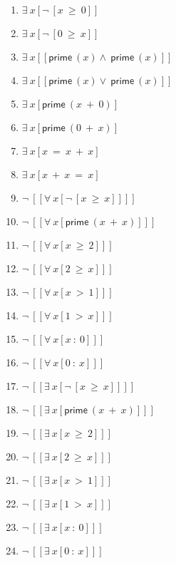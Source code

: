 \documentclass{article}
\begin{document}
\begin{enumerate}
\item $\exists \ x[\neg \ [x \ \ge \ 0]]$

\item $\exists \ x[\neg \ [0 \ \ge \ x]]$

\item $\exists \ x[[\mathsf{prime} \ (x)\wedge \ \mathsf{prime} \ (x)]]$

\item $\exists \ x[[\mathsf{prime} \ (x)\lor \ \mathsf{prime} \ (x)]]$

\item $\exists \ x[\mathsf{prime} \ (x \ + \ 0)]$

\item $\exists \ x[\mathsf{prime} \ (0 \ + \ x)]$

\item $\exists \ x[x \ = \ x \ + \ x]$

\item $\exists \ x[x \ + \ x \ = \ x]$

\item $\neg \ [[\forall \ x[\neg \ [x \ \ge \ x]]]]$

\item $\neg \ [[\forall \ x[\mathsf{prime} \ (x \ + \ x)]]]$

\item $\neg \ [[\forall \ x[x \ \ge \ 2]]]$

\item $\neg \ [[\forall \ x[2 \ \ge \ x]]]$

\item $\neg \ [[\forall \ x[x \ > \ 1]]]$

\item $\neg \ [[\forall \ x[1 \ > \ x]]]$

\item $\neg \ [[\forall \ x[x \ : \ 0]]]$

\item $\neg \ [[\forall \ x[0 \ : \ x]]]$

\item $\neg \ [[\exists \ x[\neg \ [x \ \ge \ x]]]]$

\item $\neg \ [[\exists \ x[\mathsf{prime} \ (x \ + \ x)]]]$

\item $\neg \ [[\exists \ x[x \ \ge \ 2]]]$

\item $\neg \ [[\exists \ x[2 \ \ge \ x]]]$

\item $\neg \ [[\exists \ x[x \ > \ 1]]]$

\item $\neg \ [[\exists \ x[1 \ > \ x]]]$

\item $\neg \ [[\exists \ x[x \ : \ 0]]]$

\item $\neg \ [[\exists \ x[0 \ : \ x]]]$

\end{enumerate}
\end{document}
